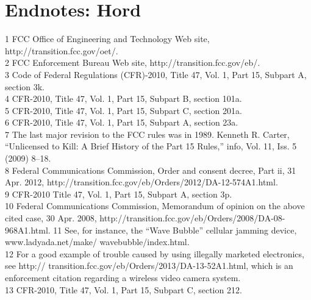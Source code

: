 \section{Endnotes: Hord}
1 FCC Office of Engineering and Technology Web site, http://transition.fcc.gov/oet/.\\
2 FCC Enforcement Bureau Web site, http://transition.fcc.gov/eb/.\\
3 Code of Federal Regulations (CFR)-2010, Title 47, Vol. 1, Part 15, Subpart A, section 3k.\\
4 CFR-2010, Title 47, Vol. 1, Part 15, Subpart B, section 101a.\\
5 CFR-2010, Title 47, Vol. 1, Part 15, Subpart C, section 201a.\\
6 CFR-2010, Title 47, Vol. 1, Part 15, Subpart A, section 23a.\\
7 The last major revision to the FCC rules was in 1989. Kenneth R. Carter, ``Unlicensed to Kill: A
Brief History of the Part 15 Rules,'' info, Vol. 11, Iss. 5 (2009) 8–18.\\
8 Federal Communications Commission, Order and consent decree, Part ii, 31 Apr. 2012,
http://transition.fcc.gov/eb/Orders/2012/DA-12-574A1.html.\\
9 CFR-2010 Title 47, Vol. 1, Part 15, Subpart A, section 3p.\\
10 Federal Communications Commission, Memorandum of opinion on the above cited case, 30 Apr. 2008, http://transition.fcc.gov/eb/Orders/2008/DA-08-968A1.html.
11 See, for instance, the ``Wave Bubble'' cellular jamming device, www.ladyada.net/make/
wavebubble/index.html.\\
12 For a good example of trouble caused by using illegally marketed electronics, see http://
transition.fcc.gov/eb/Orders/2013/DA-13-52A1.html, which is an enforcement citation
regarding a wireless video camera system.\\
13 CFR-2010, Title 47, Vol. 1, Part 15, Subpart C, section 212.\\

